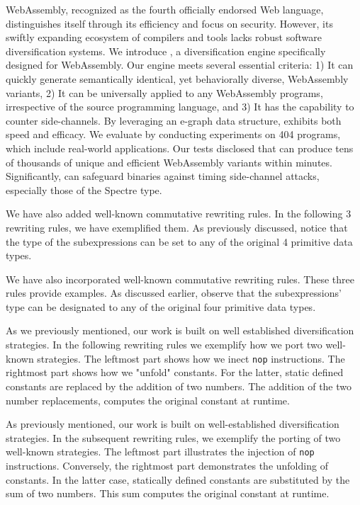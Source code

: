 WebAssembly, recognized as the fourth officially endorsed Web language, distinguishes itself through its efficiency and focus on security. 
However, its swiftly expanding ecosystem of compilers and tools lacks robust software diversification systems. 
We introduce \tool, a diversification engine specifically designed for WebAssembly. 
Our engine meets several essential criteria: 
1) It can quickly generate semantically identical, yet behaviorally diverse, WebAssembly variants, 
2) It can be universally applied to any WebAssembly programs, irrespective of the source programming language, and 
3) It has the capability to counter side-channels. 
By leveraging an e-graph data structure, \tool exhibits both speed and efficacy.
We evaluate \tool by conducting experiments on 404 programs, which include real-world applications.
Our tests disclosed that \tool can produce tens of thousands of unique and efficient WebAssembly variants within minutes.
Significantly, \tool can safeguard \wasm binaries against timing side-channel attacks, especially those of the Spectre type.




We have also added well-known commutative rewriting rules.
In the following 3 rewriting rules, we have exemplified them.
As previously discussed, notice that the type of the subexpressions can be set to any of the original 4 primitive data types.

We have also incorporated well-known commutative rewriting rules. 
These three rules provide examples. 
As discussed earlier, observe that the subexpressions' type can be designated to any of the original four primitive data types.




As we previously mentioned, our work is built on well established diversification strategies.
In the following rewriting rules we exemplify how we port two well-known strategies.
The leftmost part shows how we inect \texttt{nop} instructions.
The rightmost part shows how we "unfold" constants.
For the latter, static defined constants are replaced by the addition of two numbers.
The addition of the two number replacements, computes the original constant at runtime.

As previously mentioned, our work is built on well-established diversification strategies. 
In the subsequent rewriting rules, we exemplify the porting of two well-known strategies. 
The leftmost part illustrates the injection of \texttt{nop} instructions. 
Conversely, the rightmost part demonstrates the unfolding of constants. 
In the latter case, statically defined constants are substituted by the sum of two numbers. 
This sum computes the original constant at runtime.

